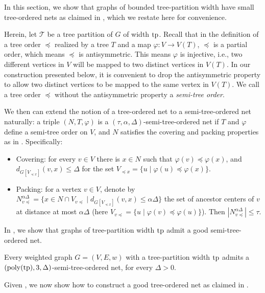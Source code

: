 \documentclass{article}
\newcommand{\tp}{{\rm tp}}
\newcommand{\poly}{\mathrm{poly}}
\begin{document}
In this section, we show that graphs of bounded tree-partition width have small tree-ordered nets as claimed in , which we restate here for convenience. 

\NetMainLemma*

Herein, let $\mathcal{T}$ be a tree partition of $G$ of width $\tp$. Recall that in the definition of a tree order $\preceq$ realized by a tree $T$ and a map $\varphi: V\rightarrow V(T)$, $\preceq$  is a partial order, which means $\preceq$ is antisymmetric. This means $\varphi$ is injective, i.e., two different vertices in $V$ will be mapped to two distinct vertices in $V(T)$. In our construction presented below, it is convenient to drop the antisymmetric property to allow two distinct vertices to be mapped to the same vertex in $V(T)$. We call a tree order $\preceq$ without the antisymmetric property a \emph{semi-tree order}. 

We then can extend the notion of a tree-ordered net to a semi-tree-ordered net naturally:  a triple $(N,T,\varphi)$ is a $(\tau,\alpha,\Delta)$-semi-tree-ordered net if $T$ and $\varphi$ define a semi-tree order on $V$, and $N$ satisfies the covering  and packing properties as in . Specifically:
\begin{itemize}
	\item Covering: for every $v\in V$ there is $x\in N$ such that $\varphi(v)\preceq\varphi(x)$, and $d_{G[V_{\preceq x}]}(v,x)\le \Delta$ for the set $V_{\preceq x}=\{u\mid \varphi(u)\preceq\varphi(x)\}$.
	\item Packing: for a vertex $v\in V$, denote by $N_{v \preceq}^{\alpha\Delta}=\{x\in N\cap V_{v\preceq}\mid d_{G[V_{\preceq x}]}(v,x)\le \alpha\Delta\}$ the set of ancestor centers of $v$ at distance at most $\alpha\Delta$ (here  $V_{v\preceq }=\{u\mid \varphi(v)\preceq\varphi(u)\}$). Then $|N_{v \preceq}^{\alpha\Delta}|\le\tau$. 
	

\end{itemize}
 In , we show that graphs of tree-partition width $\tp$ admit a good semi-tree-ordered net. 

\begin{lemma} \label{lem:SeminTreeOrderNetLemma}	
	Every weighted graph  $G=(V,E,w)$ with a tree-partition width $\tp$ admits a $(\poly(\tp),3,\Delta)$-semi-tree-ordered net, for every $\Delta>0$.    
\end{lemma}

Given , we now show how to construct a good tree-ordered net as claimed in  .
\end{document}
